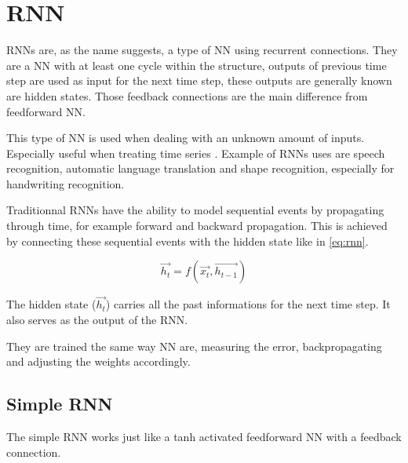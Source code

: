\section{\acl{RNN}}\label{sec:rnn}

\acp{RNN} are, as the name suggests, a type of \ac{NN} using recurrent connections. They are a \ac{NN} with at least one cycle within the structure, outputs of previous time step are used as input for the next time step, these outputs are generally known are hidden states. Those feedback connections are the main difference from feedforward \ac{NN}.

This type of \ac{NN} is used when dealing with an unknown amount of inputs. Especially useful when treating time series \cite{rnn}. Example of \acp{RNN} uses are speech recognition, automatic language translation \cite{gru} and shape recognition, especially for handwriting recognition.

Traditionnal \acp{RNN} have the ability to model sequential events by propagating through time, for example forward and backward propagation. This is achieved by connecting these sequential events with the hidden state like in \cref{eq:rnn}.

\begin{equation}\label{eq:rnn}
  \overrightarrow{h_t}=f(\overrightarrow{x_t},\overrightarrow{h_{t-1}})
\end{equation}

The hidden state ($\overrightarrow{h_t}$) carries all the past informations for the next time step. It also serves as the output of the \ac{RNN}.

They are trained the same way \ac{NN} are, measuring the error, backpropagating and adjusting the weights accordingly.

\subsection{Simple \acl{RNN}}

The simple \ac{RNN} works just like a \ac{tanh} activated feedforward \ac{NN} with a feedback connection.

\begin{figure}[H]
  \centering
  \begin{minipage}{\columnwidth}
  \end{minipage}
  \begin{minipage}{\columnwidth}
  \end{minipage}
  \caption{}
\end{figure}

